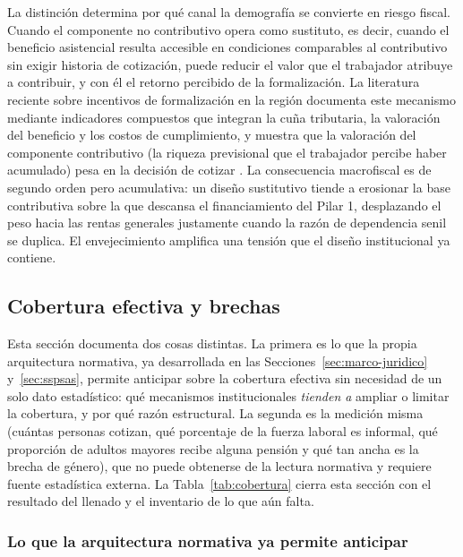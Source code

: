 \documentclass[12pt, letterpaper]{article}
\begin{document}
La distinción determina por qué canal la demografía se convierte en riesgo fiscal.
Cuando el componente no contributivo opera como sustituto, es decir, cuando el
beneficio asistencial resulta accesible en condiciones comparables al contributivo
sin exigir historia de cotización, puede reducir el valor que el trabajador
atribuye a contribuir, y con él el retorno percibido de la formalización. La literatura reciente sobre incentivos de formalización en la
región documenta este mecanismo mediante indicadores compuestos que integran la
cuña tributaria, la valoración del beneficio y los costos de cumplimiento, y
muestra que la valoración del componente contributivo (la riqueza previsional que
el trabajador percibe haber acumulado) pesa en la decisión de cotizar
\citep{wb2025}. La consecuencia macrofiscal es de segundo orden pero acumulativa:
un diseño sustitutivo tiende a erosionar la base contributiva sobre la que
descansa el financiamiento del Pilar 1, desplazando el peso hacia las rentas
generales justamente cuando la razón de dependencia senil se duplica. El
envejecimiento amplifica una tensión que el diseño institucional ya contiene.

\subsection{Cobertura efectiva y brechas}
\label{sec:cobertura}

Esta sección documenta dos cosas distintas. La primera es lo que la propia arquitectura normativa, ya desarrollada en las Secciones~\ref{sec:marco-juridico} y~\ref{sec:sspsas}, permite anticipar sobre la cobertura efectiva sin necesidad de un solo dato estadístico: qué mecanismos institucionales \textit{tienden a} ampliar o limitar la cobertura, y por qué razón estructural. La segunda es la medición misma (cuántas personas cotizan, qué porcentaje de la fuerza laboral es informal, qué proporción de adultos mayores recibe alguna pensión y qué tan ancha es la brecha de género), que no puede obtenerse de la lectura normativa y requiere fuente estadística externa. La Tabla~\ref{tab:cobertura} cierra esta sección con el resultado del llenado y el inventario de lo que aún falta.

\subsubsection{Lo que la arquitectura normativa ya permite anticipar}
\label{sec:hipotesis-cobertura}
\end{document}
